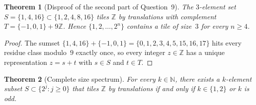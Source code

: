 \documentclass[11pt]{article}
\newtheorem{theorem}{Theorem}
\begin{document}
\begin{theorem}[Disproof of the second part of Question~9]\label{thm:ce}
The $3$-element set $S = \{1, 4, 16\} \subset \{1, 2, 4, 8, 16\}$ tiles $\mathbb{Z}$ by translations with complement $T = \{-1, 0, 1\} + 9\mathbb{Z}$. Hence $\{1, 2, \dots, 2^n\}$ contains a tile of size~$3$ for every $n \ge 4$.
\end{theorem}

\begin{proof}
The sumset $\{1, 4, 16\} + \{-1, 0, 1\} = \{0, 1, 2, 3, 4, 5, 15, 16, 17\}$ hits every residue class modulo~$9$ exactly once, so every integer $z \in \mathbb{Z}$ has a unique representation $z = s + t$ with $s \in S$ and $t \in T$.
\end{proof}

\begin{theorem}[Complete size spectrum]\label{thm:spec}
For every $k \in \mathbb{N}$, there exists a $k$-element subset $S \subset \{2^j : j \ge 0\}$ that tiles $\mathbb{Z}$ by translations if and only if $k \in \{1, 2\}$ or $k$ is odd.
\end{theorem}
\end{document}
